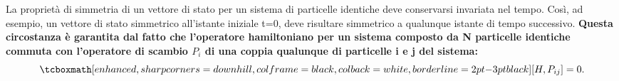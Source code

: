 \documentclass[a4paper,12pt,oneside]{book}
\begin{document}
La proprietà di simmetria di un vettore di stato per un sistema di particelle identiche deve conservarsi invariata nel tempo. Così, ad esempio, un vettore di stato simmetrico all'istante iniziale t=0, deve risultare simmetrico a qualunque istante di tempo successivo. \textbf{Questa circostanza è garantita dal fatto che l'operatore hamiltoniano per un sistema composto da N particelle identiche commuta con l'operatore di scambio $P_{i}$ di una coppia qualunque di particelle i e j del sistema:}\\
	\begin{equation}
		\tcboxmath[enhanced, sharp corners=downhill, colframe=black, colback=white, borderline={2pt}{-3pt}{black}]{
			\left [ H, P_{ij}\right ]=0.
			 }
	\end{equation}\\
	
\end{document}
